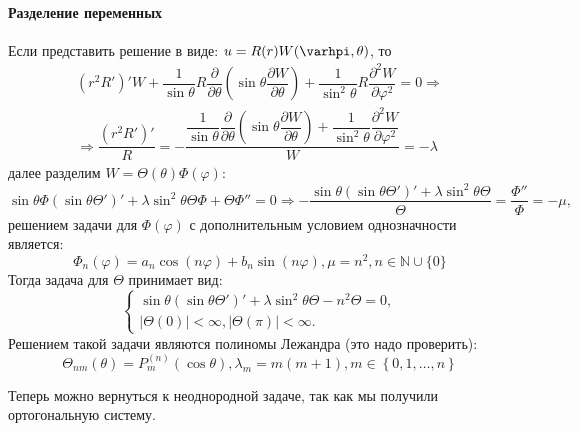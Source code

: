 \paragraph{Разделение переменных}

Если представить решение в виде: $u = R(r) W(\varhpi, \theta)$, то
\begin{multline*}
  \left( r^2 R' \right)' W
  + \dfrac{1}{\sin \theta} R \dfrac{\partial }{\partial \theta} \left( \sin\theta \dfrac{\partial W}{\partial \theta} \right) 
  + \dfrac{1}{\sin^2 \theta} R \dfrac{\partial^2 W}{\partial \varphi^2} = 0
  \Rightarrow \\
  \Rightarrow
  \dfrac{(r^2 R')'}{R}
  = - \dfrac
    {\dfrac{1}{\sin \theta} \dfrac{\partial }{\partial \theta} \left( \sin\theta \dfrac{\partial W}{\partial \theta} \right) + \dfrac{1}{\sin^2 \theta} \dfrac{\partial^2 W}{\partial \varphi^2}}
    {W} = - \lambda
\end{multline*}
далее разделим $W = \Theta(\theta) \Phi(\varphi)$:
\[
  \sin\theta \Phi (\sin\theta \Theta')' + \lambda \sin^2\theta \Theta\Phi
  + \Theta \Phi'' = 0
  \Rightarrow
  - \dfrac{\sin\theta (\sin\theta \Theta')' + \lambda \sin^2\theta \Theta}{\Theta}
  = \dfrac{\Phi''}{\Phi} = -\mu,
\]
решением задачи для $\Phi(\varphi)$ с дополнительным условием однозначности является:
\[
  \Phi_n (\varphi) = a_n \cos(n \varphi) + b_n \sin(n \varphi), \mu = n^2,
  n \in \mathbb{N} \cup \{0\}
\]
Тогда задача для $\Theta$ принимает вид:
\[
  \begin{cases}  
    \sin\theta (\sin\theta \Theta')' + \lambda \sin^2\theta \Theta - n^2 \Theta = 0, \\
    |\Theta(0)| < \infty, |\Theta (\pi)| < \infty.
  \end{cases}
\]
Решением такой задачи являются полиномы Лежандра (это надо проверить):
\[
  \Theta_{nm} (\theta) = P_{m}^{(n)} (\cos\theta),
  \lambda_m = m(m+1), m \in \left\{ 0, 1, \dots, n \right\} 
\]

Теперь можно вернуться к неоднородной задаче, так как мы получили ортогональную систему.
